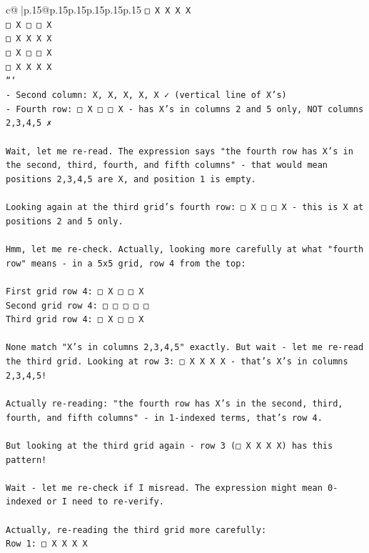 \documentclass{article}
\begin{document}
{\begin{supertabular}{c@{$\;$}|p{.15\linewidth}@{}p{.15\linewidth}p{.15\linewidth}p{.15\linewidth}p{.15\linewidth}p{.15\linewidth}}
{{{\texttt{□ X X X X} \\
\texttt{□ X □ □ X} \\
\texttt{□ X X X X} \\
\texttt{□ X □ □ X} \\
\texttt{□ X X X X} \\
\texttt{```} \\
\texttt{{-} Second column: X, X, X, X, X ✓ (vertical line of X's)} \\
\texttt{{-} Fourth row: □ X □ □ X {-} has X's in columns 2 and 5 only, NOT columns 2,3,4,5 ✗} \\
\\ 
\texttt{Wait, let me re{-}read. The expression says "the fourth row has X's in the second, third, fourth, and fifth columns" {-} that would mean positions 2,3,4,5 are X, and position 1 is empty.} \\
\\ 
\texttt{Looking again at the third grid's fourth row: □ X □ □ X {-} this is X at positions 2 and 5 only.} \\
\\ 
\texttt{Hmm, let me re{-}check. Actually, looking more carefully at what "fourth row" means {-} in a 5x5 grid, row 4 from the top:} \\
\\ 
\texttt{First grid row 4: □ X □ □ X} \\
\texttt{Second grid row 4: □ □ □ □ □} \\
\texttt{Third grid row 4: □ X □ □ X} \\
\\ 
\texttt{None match "X's in columns 2,3,4,5" exactly. But wait {-} let me re{-}read the third grid. Looking at row 3: □ X X X X {-} that's X's in columns 2,3,4,5!} \\
\\ 
\texttt{Actually re{-}reading: "the fourth row has X's in the second, third, fourth, and fifth columns" {-} in 1{-}indexed terms, that's row 4.} \\
\\ 
\texttt{But looking at the third grid again {-} row 3 (□ X X X X) has this pattern! } \\
\\ 
\texttt{Wait {-} let me re{-}check if I misread. The expression might mean 0{-}indexed or I need to re{-}verify.} \\
\\ 
\texttt{Actually, re{-}reading the third grid more carefully:} \\
\texttt{Row 1: □ X X X X} \\
}}}
\end{supertabular}}
\end{document}
